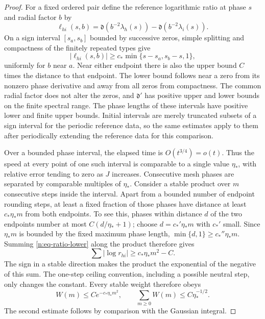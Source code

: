 \begin{proof}
For a fixed ordered pair define the reference logarithmic ratio at phase
\(s\) and radial factor \(b\) by
\[
 \ell_{hi}(s,b)
 =\mathfrak d(b^{-2}\lambda_h(s))
       -\mathfrak d(b^{-2}\lambda_i(s)).
\]
On a sign interval \([s_a,s_b]\) bounded by successive zeros, simple
splitting and compactness of the finitely repeated types give
\begin{equation}
 |\ell_{hi}(s,b)|
 \geq c_*\min\{s-s_a,s_b-s,1\},
 \label{n:eq-ratio-lower}
\end{equation}
uniformly for \(b\) near \(a\).  Near either endpoint there is also the
upper bound \(C\) times the distance to that endpoint.  The lower bound
follows near a zero from its nonzero phase derivative and away from all
zeros from compactness.  The common radial factor does not alter the zeros,
and \(\mathfrak d'\) has positive upper and lower bounds on the finite
spectral range.  The phase lengths of these intervals have positive lower
and finite upper bounds.  Initial intervals are merely truncated subsets
of a sign interval for the periodic reference data, so the same estimates
apply to them after periodically extending the reference data for this
comparison.

Over a bounded phase interval, the elapsed time is \(O(t^{3/4})=o(t)\).
Thus the speed at every point of one such interval is comparable to a
single value \(\eta_*\), with relative error tending to zero as \(J\)
increases.  Consecutive mesh phases are separated by comparable multiples
of \(\eta_*\).  Consider a stable product over \(m\) consecutive steps
inside the interval.  Apart from a bounded number of endpoint rounding
steps, at least a fixed fraction of those phases have distance at least
\(c_*\eta_*m\) from both endpoints.  To see this, phases within distance
\(d\) of the two endpoints number at most \(C(d/\eta_*+1)\); choose
\(d=c_*'\eta_*m\) with \(c_*'\) small.  Since \(\eta_*m\) is bounded by the
fixed maximum phase length, \(\min\{d,1\}\geq c_*''\eta_*m\).
Summing \eqref{n:eq-ratio-lower} along the product therefore gives
\[
 \sum |\log r_{hi}|\geq c_*\eta_*m^2-C.
\]
The sign in a stable direction makes the product the exponential of the
negative of this sum.  The one-step ceiling convention, including a
possible neutral step, only changes the constant.  Every stable weight
therefore obeys
\begin{equation}
 W(m)\leq C e^{-c_*\eta_*m^2},\qquad
 \sum_{m\geq0}W(m)\leq C\eta_*^{-1/2}.
 \label{n:eq-gaussian-green}
\end{equation}
The second estimate follows by comparison with the Gaussian integral.


\end{proof}
